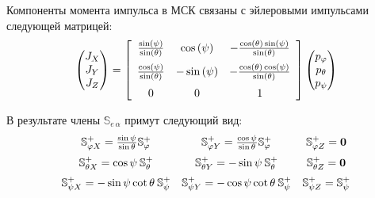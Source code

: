 Компоненты момента импульса в МСК связаны с эйлеровыми импульсами следующей матрицей:
\[
\left(\begin{matrix}
J_X \\
J_Y \\
J_Z 
\end{matrix}\right)=
 \left[ \begin {array}{ccc} {\frac {\sin \left( \psi \right) }{\sin
 \left( \theta \right) }}&\cos \left( \psi \right) &-{\frac {\cos
 \left( \theta \right) \sin \left( \psi \right) }{\sin \left( \theta
 \right) }}\\ \noalign{\medskip}{\frac {\cos \left( \psi \right) }{
\sin \left( \theta \right) }}&-\sin \left( \psi \right) &-{\frac {\cos
 \left( \theta \right) \cos \left( \psi \right) }{\sin \left( \theta
 \right) }}\\ \noalign{\medskip}0&0&1\end {array} \right] 
 \left(\begin{matrix}
p_{\varphi}\\
 p_{\theta}\\
  p_{\psi} 
\end{matrix}\right)
\]

В результате члены $\mathbb{S}_{e\, \alpha}$ примут следующий вид:
\begin{equation}
\label{eq:S_ealpha}
\begin {array}{ccc} \mathbb{S}^{+}_{\varphi X} = \frac{\sin\psi}{\sin\theta} \mathbb{S}^{+}_{\varphi} &\mathbb{S}^{+}_{\varphi Y} = \frac{\cos\psi}{\sin\theta} \mathbb{S}^{+}_{\varphi} & 
\mathbb{S}^{+}_{\varphi Z} = \mathbf{0} \\
 \noalign{\medskip}\mathbb{S}^{+}_{\theta X} = \cos\psi \:\mathbb{S}^{+}_{\theta} &
 \mathbb{S}^{+}_{\theta Y} = -\sin\psi\: \mathbb{S}^{+}_{\theta} &
 \mathbb{S}^{+}_{\theta Z} = \mathbf{0} \\
  \noalign{\medskip}\mathbb{S}^{+}_{\psi X} = -\sin\psi\cot\theta \:\mathbb{S}^{+}_{\psi} &
 \mathbb{S}^{+}_{\psi Y} =-\cos\psi\cot\theta\: \mathbb{S}^{+}_{\psi} &
 \mathbb{S}^{+}_{\psi Z} = \mathbb{S}^{+}_{\psi}
 \end {array}
\end{equation}


